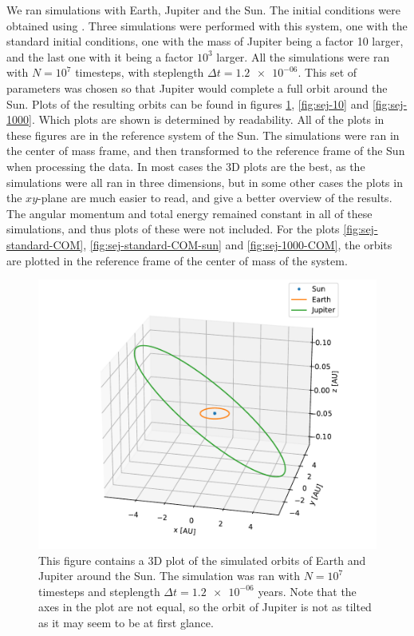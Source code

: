 \documentclass[reprint,english,notitlepage]{revtex4-1}  %
\begin{document}
We ran simulations with Earth, Jupiter and the Sun. The initial conditions were obtained using \citep{NASASolarInit}. Three simulations were performed with this system, one with the standard initial conditions, one with the mass of Jupiter being a factor 10 larger, and the last one with it being a factor $10^3$ larger. All the simulations were ran with $N=10^7$ timesteps, with steplength $\Delta t = \num{1.2e-06}$. This set of parameters was chosen so that Jupiter would complete a full orbit around the Sun. Plots of the resulting orbits can be found in figures \ref{fig:sej-standard}, \ref{fig:sej-10} and \ref{fig:sej-1000}. Which plots are shown is determined by readability. All of the plots in these figures are in the reference system of the Sun. The simulations were ran in the center of mass frame, and then transformed to the reference frame of the Sun when processing the data. In most cases the 3D plots are the best, as the simulations were all ran in three dimensions, but in some other cases the plots in the $xy$-plane are much easier to read, and give a better overview of the results. The angular momentum and total energy remained constant in all of these simulations, and thus plots of these were not included. For the plots \ref{fig:sej-standard-COM}, \ref{fig:sej-standard-COM-sun} and \ref{fig:sej-1000-COM}, the orbits are plotted in the reference frame of the center of mass of the system.

\begin{figure}[H]
\includegraphics[width=\columnwidth]{../data/figures/sun-earth-jupiter/sej_1xM_vv_orbit3D.pdf}
\caption{This figure contains a 3D plot of the simulated orbits of Earth and Jupiter around the Sun. The simulation was ran with $N=10^7$ timesteps and steplength $\Delta t = \num{1.2e-06}$ years. Note that the axes in the plot are not equal, so the orbit of Jupiter is not as tilted as it may seem to be at first glance.}
\label{fig:sej-standard}
\end{figure}
\end{document}
